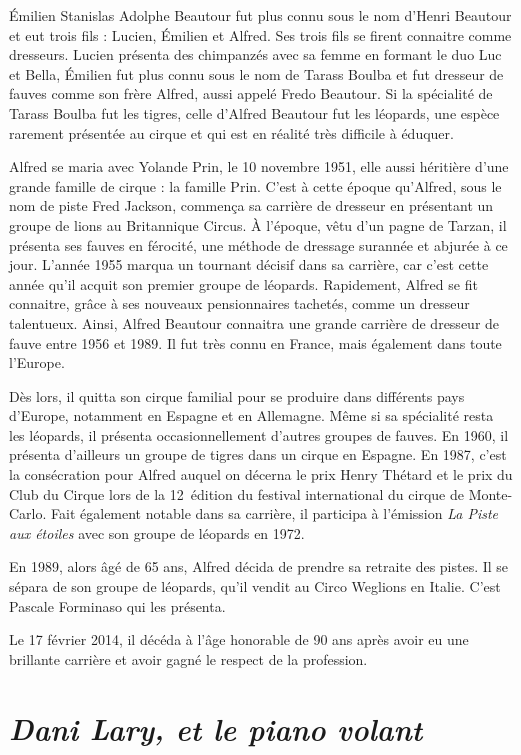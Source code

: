 Émilien Stanislas Adolphe Beautour fut plus connu sous le nom d’Henri Beautour et eut trois fils : Lucien, Émilien et Alfred. Ses trois fils se firent connaitre comme dresseurs. Lucien présenta des chimpanzés avec sa femme en formant le duo Luc et Bella, Émilien fut plus connu sous le nom de Tarass Boulba et fut dresseur de fauves comme son frère Alfred, aussi appelé Fredo Beautour.  Si la spécialité de Tarass Boulba fut les tigres, celle d’Alfred Beautour fut les léopards, une espèce rarement présentée au cirque et qui est en réalité très difficile à éduquer.

Alfred se maria avec Yolande Prin, le 10 novembre 1951, elle aussi héritière d’une grande famille de cirque : la famille Prin. C’est à cette époque qu’Alfred, sous le nom de piste Fred Jackson, commença sa carrière de dresseur en présentant un groupe de lions au Britannique Circus. À l’époque, vêtu d’un pagne de Tarzan, il présenta ses fauves en férocité, une méthode de dressage surannée et abjurée à ce jour. L'année 1955 marqua un tournant décisif dans sa carrière, car c’est cette année qu’il acquit son premier groupe de léopards. Rapidement, Alfred se fit connaitre, grâce à ses nouveaux pensionnaires tachetés, comme un dresseur talentueux. Ainsi, Alfred Beautour connaitra une grande carrière de dresseur de fauve entre 1956 et 1989. Il fut très connu en France, mais également dans toute l’Europe.

Dès lors, il quitta son cirque familial pour se produire dans différents pays d’Europe, notamment en Espagne et en Allemagne. Même si sa spécialité resta les léopards, il présenta occasionnellement d’autres groupes de fauves. En 1960, il présenta d’ailleurs un groupe de tigres dans un cirque en Espagne. En 1987, c’est la consécration pour Alfred auquel on décerna le prix Henry Thétard et le prix du Club du Cirque lors de la 12\ieme~édition du festival international du cirque de Monte-Carlo. Fait également notable dans sa carrière, il participa à l’émission \textit{La Piste aux étoiles} avec son groupe de léopards en 1972.

En 1989, alors âgé de 65 ans, Alfred décida de prendre sa retraite des pistes. Il se sépara de son groupe de léopards, qu'il vendit au Circo Weglions en Italie. C'est Pascale Forminaso qui les présenta.

Le 17 février 2014, il décéda à l’âge honorable de 90 ans après avoir eu une brillante carrière et avoir gagné le respect de la profession.

\section*{\textit{Dani Lary, et le piano volant}}
{}

